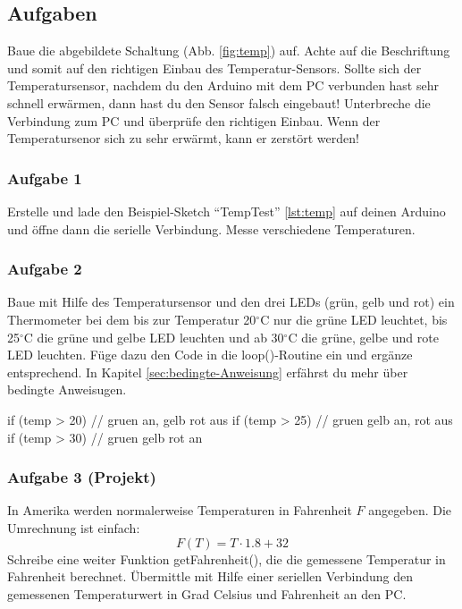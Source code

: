 \subsection{Aufgaben}

Baue die abgebildete Schaltung (Abb. \ref{fig:temp}) auf. Achte auf die Beschriftung und somit auf den richtigen Einbau des Temperatur-Sensors. Sollte sich der Temperatursensor, nachdem du den Arduino mit dem PC verbunden hast sehr schnell erwärmen, dann hast du den Sensor falsch eingebaut! Unterbreche die Verbindung zum PC und überprüfe den richtigen Einbau. Wenn der Temperatursenor sich zu sehr erwärmt, kann er zerstört werden! 
 
\subsubsection{Aufgabe 1}
Erstelle und lade den Beispiel-Sketch ``TempTest'' \ref{lst:temp} auf deinen Arduino und öffne dann die serielle Verbindung. Messe verschiedene Temperaturen.


\subsubsection{Aufgabe 2}

Baue mit Hilfe des Temperatursensor und den drei LEDs (grün, gelb und rot) ein Thermometer bei dem bis zur 
Temperatur 20$^{\circ}$C nur die grüne LED leuchtet, bis 25$^{\circ}$C die grüne und gelbe LED leuchten und ab 30$^{\circ}$C die grüne, gelbe und rote LED leuchten. 
Füge dazu den Code in die loop()-Routine ein und ergänze entsprechend. In Kapitel \ref{sec:bedingte-Anweisung} erfährst du mehr über bedingte Anweisugen. 

\begin{arduinoCode}{}{}
if (temp > 20) {
  // gruen an, gelb rot aus
}
if (temp > 25) {
  // gruen gelb an, rot aus
}
if (temp > 30) {
  // gruen gelb rot an
}
\end{arduinoCode}


\subsubsection{Aufgabe 3 (Projekt)}%

In Amerika werden normalerweise Temperaturen in Fahrenheit $F$ angegeben. Die Umrechnung ist einfach: 
\begin{equation}
 F(T) = T\cdot 1.8 + 32
\end{equation}
Schreibe eine weiter Funktion getFahrenheit(), die die gemessene Temperatur in Fahrenheit berechnet. Übermittle mit Hilfe einer seriellen Verbindung den gemessenen Temperaturwert in Grad Celsius und Fahrenheit an den PC.

